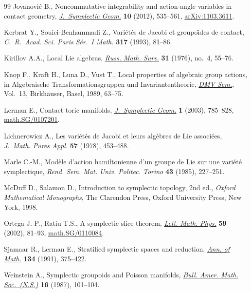 \documentclass[pdftex]{sigma}
\numberwithin{equation}{section}
\begin{document}
\begin{thebibliography}{99}
Jovanovi\'c B., Noncommutative integrability and action-angle variables in
 contact geometry, \href{https://doi.org/10.4310/JSG.2012.v10.n4.a3}{\textit{J.~Symplectic Geom.}} \textbf{10} (2012), 535--561,
 \href{http://arxiv.org/abs/1103.3611}{arXiv:1103.3611}.

Kerbrat Y., Souici-Benhammadi Z., Vari\'et\'es de {J}acobi et groupo\"\i des de
 contact, \textit{C.~R.~Acad. Sci. Paris S\'er.~I Math.} \textbf{317} (1993),
 81--86.

Kirillov A.A., Local {L}ie algebras, \href{https://doi.org/10.1070/RM1976v031n04ABEH001556}{\textit{Russ. Math. Surv.}} \textbf{31}
 (1976), no.~4, 55--76.

Knop F., Kraft H., Luna D., Vust T., Local properties of algebraic group
 actions, in Algebraische {T}ransformationsgruppen und {I}nvariantentheorie,
 \href{https://doi.org/10.1007/978-3-0348-7662-9_4}{\textit{DMV Sem.}}, Vol.~13, Birkh\"auser, Basel, 1989, 63--75.

Lerman E., Contact toric manifolds, \href{https://doi.org/10.4310/JSG.2001.v1.n4.a6}{\textit{J.~Symplectic Geom.}} \textbf{1}
 (2003), 785--828, \href{http://arxiv.org/abs/math.SG/0107201}{math.SG/0107201}.

Lichnerowicz A., Les vari\'et\'es de {J}acobi et leurs alg\`ebres de {L}ie
 associ\'ees, \textit{J.~Math. Pures Appl.} \textbf{57} (1978), 453--488.

Marle C.-M., Mod\`ele d'action hamiltonienne d'un groupe de {L}ie sur une
 vari\'et\'e symplectique, \textit{Rend. Sem. Mat. Univ. Politec. Torino}
 \textbf{43} (1985), 227--251.

McDuf\/f D., Salamon D., Introduction to symplectic topology, 2nd ed., \textit{Oxford
 Mathematical Monographs}, The Clarendon Press, Oxford University Press, New
 York, 1998.

Ortega J.-P., Ratiu T.S., A symplectic slice theorem, \href{https://doi.org/10.1023/A:1014407427842}{\textit{Lett. Math. Phys.}}
 \textbf{59} (2002), 81--93, \href{http://arxiv.org/abs/math.SG/0110084}{math.SG/0110084}.

Sjamaar R., Lerman E., Stratif\/ied symplectic spaces and reduction, \href{https://doi.org/10.2307/2944350}{\textit{Ann.
 of Math.}} \textbf{134} (1991), 375--422.

Weinstein A., Symplectic groupoids and {P}oisson manifolds, \href{https://doi.org/10.1090/S0273-0979-1987-15473-5}{\textit{Bull. Amer.
 Math. Soc.~(N.S.)}} \textbf{16} (1987), 101--104.


\end{thebibliography}
\end{document}
